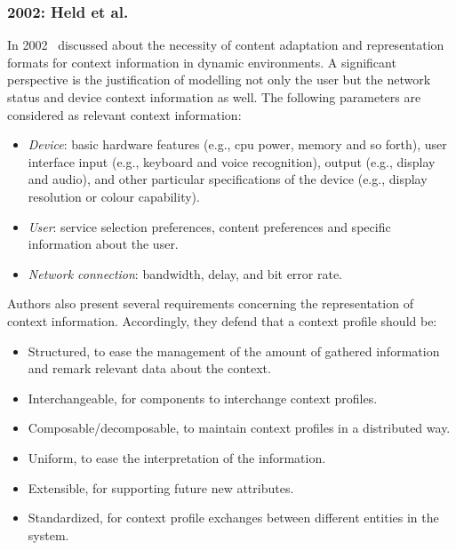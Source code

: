 \subsubsection{2002: Held et al.}
\label{sec:held}

In 2002~\citet{held_modeling_2002} discussed about the necessity of content 
adaptation and representation formats for context information in dynamic 
environments. A significant perspective is the justification of modelling not 
only the user but the network status and device context information as well.
The following parameters are considered as relevant context information:

\begin{itemize}
  \item \textit{Device}: basic hardware features (e.g., \acs{cpu} power, memory 
  and so forth), user interface input (e.g., keyboard and voice recognition), 
  output (e.g., display and audio), and other particular specifications of the 
  device (e.g., display resolution or colour capability).
  \item \textit{User}: service selection preferences, content preferences and 
  specific information about the user.
  \item \textit{Network connection}: bandwidth, delay, and bit error rate. 
\end{itemize}

Authors also present several requirements concerning the representation of
context information. Accordingly, they defend that a context profile should be:

\begin{itemize}
  \item Structured, to ease the management of the amount of gathered information
  and remark relevant data about the context.
  \item Interchangeable, for components to interchange context profiles.
  \item Composable/decomposable, to maintain context profiles in a distributed way.
  \item Uniform, to ease the interpretation of the information.
  \item Extensible, for supporting future new attributes.
  \item Standardized, for context profile exchanges between different entities
  in the system.
\end{itemize}